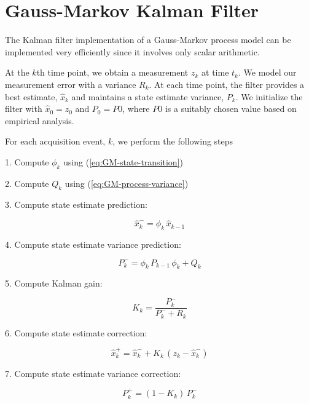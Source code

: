 \documentclass[12pt]{article}
\begin{document}
\clearpage
\section{Gauss-Markov Kalman Filter}

The Kalman filter implementation of a Gauss-Markov process model can be implemented
very efficiently since it involves only scalar arithmetic.

At the $k$th time point, we obtain a measurement $z_k$ at time $t_k$. We model our
measurement error with a variance $R_k$. At each time point, the filter provides a best
estimate, $\hat{x}_k$ and maintains a state estimate variance, $P_k$. We initialize the
filter with $\hat{x}_0 = z_0$ and $P_0 = P0$, where $P0$ is a suitably chosen value based
on empirical analysis.

For each acquisition event, $k$, we perform the following steps

1. Compute $\phi_k$ using (\ref{eq:GM-state-transition})

2. Compute $Q_k$ using (\ref{eq:GM-process-variance})

3. Compute state estimate prediction:

\begin{equation}
    \hat{x}_k^- = \phi_k \, \hat{x}_{k-1}
    \label{eq:GM-KF-x-prediction}
\end{equation}

4. Compute state estimate variance prediction:

\begin{equation}
    P_k^- = \phi_k \, P_{k-1} \, \phi_k + Q_k
    \label{eq:GM-KF-P-prediction}
\end{equation}

5. Compute Kalman gain:

\begin{equation}
    K_k = \frac{P_k^-}{P_k^- + R_k}
    \label{eq:GM-KF-gain}
\end{equation}

6. Compute state estimate correction:

\begin{equation}
    \hat{x}_k^+ = \hat{x}_k^- + K_k \,(z_k - \hat{x}_k^-)
    \label{eq:GM-KF-x-correction}
\end{equation}

7. Compute state estimate variance correction:

\begin{equation}
    P_k^+ = (1 - K_k) \, P_k^-
    \label{eq:GM-KF-P-correction}
\end{equation}
\end{document}
